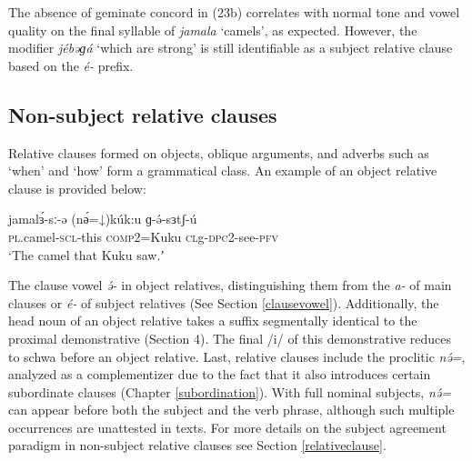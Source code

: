 The absence of geminate concord in (23b) correlates with normal tone and vowel quality on the final syllable of \textit{jamala} ‘camels’, as expected. However, the modifier \textit{jébəɡá} ‘which are strong’ is still identifiable as a subject relative clause based on the \textit{é-} prefix. 


\subsection{Non-subject relative clauses}\label{nonsubjectrelative}

Relative clauses formed on objects, oblique arguments, and adverbs such as `when' and `how' form a grammatical class. An example of an object relative clause is provided below:

\ea 	\gll  jamalɜ́-sː-ə		(nә́=↓)kúk:u		ɡ-ə́-sɜtʃ-ú 	\\
 			\textsc{pl}.camel-\textsc{scl}-this 	\textsc{comp}2=Kuku	\textsc{cl}g-\textsc{dpc}2-see-\textsc{pfv}	\\
		\glt ‘The camel that Kuku saw.ʼ
\z 

The clause vowel \textit{ə́-} in object relatives, distinguishing them from the \textit{a-} of main clauses or \textit{é-} of subject relatives (See Section \ref{clausevowel}). Additionally, the head noun of an object relative takes a suffix segmentally identical to the proximal demonstrative (Section 4). The final /i/ of this demonstrative reduces to schwa before an object relative. Last, relative clauses include the proclitic \textit{nə́=}, analyzed as a complementizer due to the fact that it also introduces certain subordinate clauses (Chapter \ref{subordination}). With full nominal subjects, \textit{nə́=} can appear before both the subject and the verb phrase, although such multiple occurrences are unattested in texts. For more details on the subject agreement paradigm in non-subject relative clauses see Section \ref{relativeclause}. 




